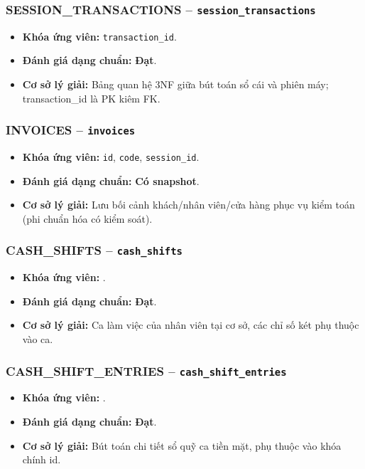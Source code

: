 \subsubsection{SESSION_TRANSACTIONS -- \texttt{session\_transactions}}
\begin{itemize}
  \item \textbf{Khóa ứng viên:} \texttt{transaction\_id}.
  \item \textbf{Đánh giá dạng chuẩn:} \textbf{Đạt}.
  \item \textbf{Cơ sở lý giải:} Bảng quan hệ 3NF giữa bút toán sổ cái và phiên máy; transaction_id là PK kiêm FK.
\end{itemize}

\subsubsection{INVOICES -- \texttt{invoices}}
\begin{itemize}
  \item \textbf{Khóa ứng viên:} \texttt{id}, \texttt{code}, \texttt{session\_id}.
  \item \textbf{Đánh giá dạng chuẩn:} \textbf{Có snapshot}.
  \item \textbf{Cơ sở lý giải:} Lưu bối cảnh khách/nhân viên/cửa hàng phục vụ kiểm toán (phi chuẩn hóa có kiểm soát).
\end{itemize}

\subsubsection{CASH_SHIFTS -- \texttt{cash\_shifts}}
\begin{itemize}
  \item \textbf{Khóa ứng viên:} \texttt{}.
  \item \textbf{Đánh giá dạng chuẩn:} \textbf{Đạt}.
  \item \textbf{Cơ sở lý giải:} Ca làm việc của nhân viên tại cơ sở, các chỉ số két phụ thuộc vào ca.
\end{itemize}

\subsubsection{CASH_SHIFT_ENTRIES -- \texttt{cash\_shift\_entries}}
\begin{itemize}
  \item \textbf{Khóa ứng viên:} \texttt{}.
  \item \textbf{Đánh giá dạng chuẩn:} \textbf{Đạt}.
  \item \textbf{Cơ sở lý giải:} Bút toán chi tiết sổ quỹ ca tiền mặt, phụ thuộc vào khóa chính id.
\end{itemize}

